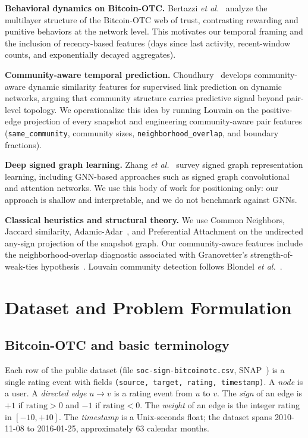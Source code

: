 \documentclass[conference]{IEEEtran}
\newcommand{\code}[1]{\texttt{#1}}
\begin{document}
\textbf{Behavioral dynamics on Bitcoin-OTC.} Bertazzi
\emph{et al.}~\cite{bertazzi2018} analyze the multilayer structure of
the Bitcoin-OTC web of trust, contrasting rewarding and punitive
behaviors at the network level. This motivates our temporal framing
and the inclusion of recency-based features (days since last activity,
recent-window counts, and exponentially decayed aggregates).

\textbf{Community-aware temporal prediction.}
Choudhury~\cite{choudhury2024} develops community-aware dynamic
similarity features for supervised link prediction on dynamic
networks, arguing that community structure carries predictive signal
beyond pair-level topology. We operationalize this idea by running
Louvain on the positive-edge projection of every snapshot and
engineering community-aware pair features
(\code{same\_community}, community sizes, \code{neighborhood\_overlap},
and boundary fractions).

\textbf{Deep signed graph learning.} Zhang \emph{et al.}~\cite{zhang2024}
survey signed graph representation learning, including
GNN-based approaches such as signed graph convolutional and attention
networks. We use this body of work for positioning only: our approach
is shallow and interpretable, and we do not benchmark against GNNs.

\textbf{Classical heuristics and structural theory.} We use Common
Neighbors, Jaccard similarity, Adamic-Adar~\cite{adamic2003}, and
Preferential Attachment on the undirected any-sign projection of the
snapshot graph. Our community-aware features include the
neighborhood-overlap diagnostic associated with Granovetter's
strength-of-weak-ties hypothesis~\cite{granovetter1973}. Louvain
community detection follows Blondel \emph{et al.}~\cite{blondel2008}.

\section{Dataset and Problem Formulation}

\subsection{Bitcoin-OTC and basic terminology}
Each row of the public dataset (file \code{soc-sign-bitcoinotc.csv},
SNAP~\cite{snap}) is a single rating event with fields
\code{(source, target, rating, timestamp)}. A \emph{node} is a user.
A \emph{directed edge} $u \to v$ is a rating event from $u$ to $v$. The
\emph{sign} of an edge is $+1$ if $\text{rating} > 0$ and $-1$ if
$\text{rating} < 0$. The \emph{weight} of an edge is the integer
rating in $[-10, +10]$. The \emph{timestamp} is a Unix-seconds float;
the dataset spans 2010-11-08 to 2016-01-25, approximately 63 calendar
months.
\end{document}
